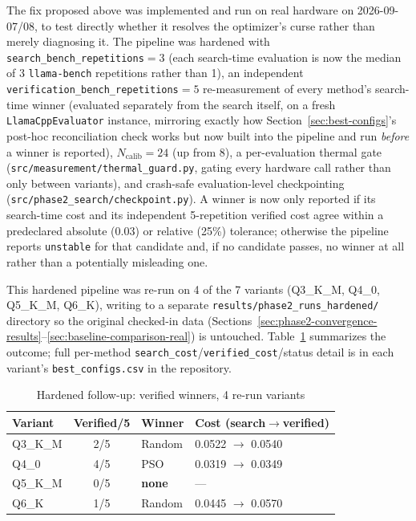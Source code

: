 \documentclass[journal]{IEEEtran}
\begin{document}
The fix proposed above was implemented and run on real hardware on 2026-09-07/08, to test directly whether it resolves the optimizer's curse rather than merely diagnosing it. The pipeline was hardened with \texttt{search\_bench\_repetitions}$=3$ (each search-time evaluation is now the median of 3 \texttt{llama-bench} repetitions rather than 1), an independent \texttt{verification\_bench\_repetitions}$=5$ re-measurement of every method's search-time winner (evaluated separately from the search itself, on a fresh \texttt{LlamaCppEvaluator} instance, mirroring exactly how Section~\ref{sec:best-configs}'s post-hoc reconciliation check works but now built into the pipeline and run \emph{before} a winner is reported), $N_{\text{calib}}=24$ (up from 8), a per-evaluation thermal gate (\texttt{src/measurement/thermal\_guard.py}, gating every hardware call rather than only between variants), and crash-safe evaluation-level checkpointing (\texttt{src/phase2\_search/checkpoint.py}). A winner is now only reported if its search-time cost and its independent 5-repetition verified cost agree within a predeclared absolute (0.03) or relative (25\%) tolerance; otherwise the pipeline reports \texttt{unstable} for that candidate and, if no candidate passes, no winner at all rather than a potentially misleading one.

This hardened pipeline was re-run on 4 of the 7 variants (Q3\_K\_M, Q4\_0, Q5\_K\_M, Q6\_K), writing to a separate \texttt{results/phase2\_runs\_hardened/} directory so the original checked-in data (Sections~\ref{sec:phase2-convergence-results}--\ref{sec:baseline-comparison-real}) is untouched. Table~\ref{tab:hardened-followup} summarizes the outcome; full per-method \texttt{search\_cost}/\texttt{verified\_cost}/status detail is in each variant's \texttt{best\_configs.csv} in the repository.

\begin{table}[t]
\caption{Hardened follow-up: verified winners, 4 re-run variants}
\label{tab:hardened-followup}
\centering
\footnotesize
\begin{tabular}{@{}lcll@{}}
\toprule
Variant & Verified/5 & Winner & Cost (search$\to$verified) \\
\midrule
Q3\_K\_M & 2/5 & Random & 0.0522 $\to$ 0.0540 \\
Q4\_0    & 4/5 & PSO    & 0.0319 $\to$ 0.0349 \\
Q5\_K\_M & 0/5 & \textbf{none} & --- \\
Q6\_K    & 1/5 & Random & 0.0445 $\to$ 0.0570 \\
\bottomrule
\end{tabular}
\end{table}
\end{document}
